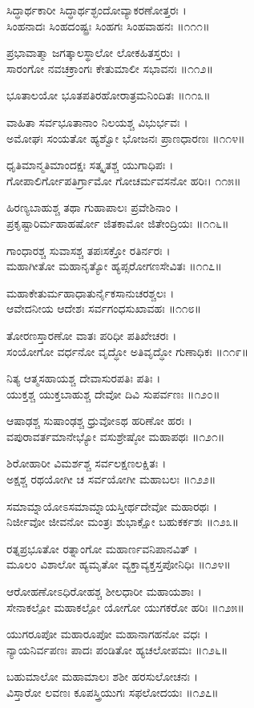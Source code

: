 ಸಿದ್ಧಾರ್ಥಕಾರೀ ಸಿದ್ಧಾರ್ಥಶ್ಛಂದೋವ್ಯಾಕರಣೋತ್ತರಃ ।\\
ಸಿಂಹನಾದಃ ಸಿಂಹದಂಷ್ಟ್ರಃ ಸಿಂಹಗಃ ಸಿಂಹವಾಹನಃ ॥೧೧೧॥

ಪ್ರಭಾವಾತ್ಮಾ ಜಗತ್ಕಾಲಸ್ಥಾಲೋ ಲೋಕಹಿತಸ್ತರುಃ ।\\
ಸಾರಂಗೋ ನವಚಕ್ರಾಂಗಃ ಕೇತುಮಾಲೀ ಸಭಾವನಃ ॥೧೧೨॥

ಭೂತಾಲಯೋ ಭೂತಪತಿರಹೋರಾತ್ರಮನಿಂದಿತಃ ॥೧೧೩॥

ವಾಹಿತಾ ಸರ್ವಭೂತಾನಾಂ ನಿಲಯಶ್ಚ ವಿಭುರ್ಭವಃ ।\\
ಅಮೋಘಃ ಸಂಯತೋ ಹ್ಯಶ್ವೋ ಭೋಜನಃ ಪ್ರಾಣಧಾರಣಃ ॥೧೧೪॥

ಧೃತಿಮಾನ್ಮತಿಮಾಂದಕ್ಷಃ ಸತ್ಕೃತಶ್ಚ ಯುಗಾಧಿಪಃ ।\\
ಗೋಪಾಲಿರ್ಗೋಪತಿರ್ಗ್ರಾಮೋ ಗೋಚರ್ಮವಸನೋ ಹರಿಃ। ೧೧೫॥

ಹಿರಣ್ಯಬಾಹುಶ್ಚ ತಥಾ ಗುಹಾಪಾಲಃ ಪ್ರವೇಶಿನಾಂ ।\\
ಪ್ರಕೃಷ್ಟಾರಿರ್ಮಹಾಹರ್ಷೋ ಜಿತಕಾಮೋ ಜಿತೇಂದ್ರಿಯಃ ॥೧೧೬॥

ಗಾಂಧಾರಶ್ಚ ಸುವಾಸಶ್ಚ ತಪಃಸಕ್ತೋ ರತಿರ್ನರಃ ।\\
ಮಹಾಗೀತೋ ಮಹಾನೃತ್ಯೋ ಹ್ಯಪ್ಸರೋಗಣಸೇವಿತಃ ॥೧೧೭॥

ಮಹಾಕೇತುರ್ಮಹಾಧಾತುರ್ನೈಕಸಾನುಚರಶ್ಚಲಃ ।\\
ಆವೇದನೀಯ ಆದೇಶಃ ಸರ್ವಗಂಧಸುಖಾವಹಃ ॥೧೧೮॥

ತೋರಣಸ್ತಾರಣೋ ವಾತಃ ಪರಿಧೀ ಪತಿಖೇಚರಃ ।\\
ಸಂಯೋಗೋ ವರ್ಧನೋ ವೃದ್ಧೋ ಅತಿವೃದ್ಧೋ ಗುಣಾಧಿಕಃ ॥೧೧೯॥

ನಿತ್ಯ ಆತ್ಮಸಹಾಯಶ್ಚ ದೇವಾಸುರಪತಿಃ ಪತಿಃ ।\\
ಯುಕ್ತಶ್ಚ ಯುಕ್ತಬಾಹುಶ್ಚ ದೇವೋ ದಿವಿ ಸುಪರ್ವಣಃ ॥೧೨೦॥

ಆಷಾಢಶ್ಚ ಸುಷಾಂಢಶ್ಚ ಧ್ರುವೋಽಥ ಹರಿಣೋ ಹರಃ ।\\
ವಪುರಾವರ್ತಮಾನೇಭ್ಯೋ ವಸುಶ್ರೇಷ್ಠೋ ಮಹಾಪಥಃ ॥೧೨೧॥

ಶಿರೋಹಾರೀ ವಿಮರ್ಶಶ್ಚ ಸರ್ವಲಕ್ಷಣಲಕ್ಷಿತಃ ।\\
ಅಕ್ಷಶ್ಚ ರಥಯೋಗೀ ಚ ಸರ್ವಯೋಗೀ ಮಹಾಬಲಃ ॥೧೨೨॥

ಸಮಾಮ್ನಾಯೋಽಸಮಾಮ್ನಾಯಸ್ತೀರ್ಥದೇವೋ ಮಹಾರಥಃ ।\\
ನಿರ್ಜೀವೋ ಜೀವನೋ ಮಂತ್ರಃ ಶುಭಾಕ್ಷೋ ಬಹುಕರ್ಕಶಃ ॥೧೨೩॥

ರತ್ನಪ್ರಭೂತೋ ರತ್ನಾಂಗೋ ಮಹಾರ್ಣವನಿಪಾನವಿತ್ ।\\
ಮೂಲಂ ವಿಶಾಲೋ ಹ್ಯಮೃತೋ ವ್ಯಕ್ತಾವ್ಯಕ್ತಸ್ತಪೋನಿಧಿಃ ॥೧೨೪॥

ಆರೋಹಣೋಽಧಿರೋಹಶ್ಚ ಶೀಲಧಾರೀ ಮಹಾಯಶಾಃ ।\\
ಸೇನಾಕಲ್ಪೋ ಮಹಾಕಲ್ಪೋ ಯೋಗೋ ಯುಗಕರೋ ಹರಿಃ ॥೧೨೫॥

ಯುಗರೂಪೋ ಮಹಾರೂಪೋ ಮಹಾನಾಗಹನೋ ವಧಃ ।\\
ನ್ಯಾಯನಿರ್ವಪಣಃ ಪಾದಃ ಪಂಡಿತೋ ಹ್ಯಚಲೋಪಮಃ ॥೧೨೬॥

ಬಹುಮಾಲೋ ಮಹಾಮಾಲಃ ಶಶೀ ಹರಸುಲೋಚನಃ ।\\
ವಿಸ್ತಾರೋ ಲವಣಃ ಕೂಪಸ್ತ್ರಿಯುಗಃ ಸಫಲೋದಯಃ ॥೧೨೭॥


